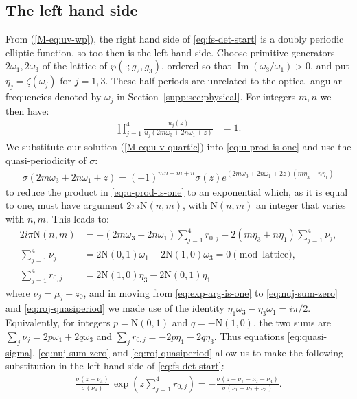 \documentclass[11pt,a4paper]{article}
\newcommand{\externaleqref}[1]{\textup{(\ref*{#1})}}
\begin{document}
\subsection{The left hand side}\label{supp:subsec:fs-quasiperiod}
From \externaleqref{M-eq:uv-wp}, the right hand side of \eqref{eq:fs-det-start} is a doubly periodic elliptic function,
so too then is the left hand side.
Choose primitive generators $2\omega_1,2\omega_3$ of the lattice of $\wp(\cdot;g_2,g_3)$, ordered so that $\operatorname{Im}(\omega_3/\omega_1)>0$, and put $\eta_j=\zeta(\omega_j)$ for $j=1,3$.
These half-periods are unrelated to the optical angular frequencies denoted by $\omega_j$ in Section~\ref{supp:sec:physical}.
For integers $m,n$ we then have:
\begin{align}
\prod_{j=1}^{4} \frac{u_j{\left(z\right)}}{u_j{\left(2 m {\omega}_{3} + 2 n {\omega}_{1} + z\right)}} & = 1. \label{eq:u-prod-is-one}
\end{align}
We substitute our solution \externaleqref{M-eq:u-v-quartic} into \eqref{eq:u-prod-is-one} and use the quasi-periodicity of $\sigma$:
\begin{align}
\sigma{\left(2 m {\omega}_{3} + 2 n {\omega}_{1} + z\right)} = \left(-1\right)^{m n + m + n} \sigma{\left(z\right)} e^{\left(2 m {\omega}_{3} + 2 n {\omega}_{1} + 2 z\right) \left(m\eta_3+n\eta_1\right)} \label{eq:quasi-sigma}
\end{align}
to reduce the product in \eqref{eq:u-prod-is-one} to an exponential which, as it is equal to one, must have argument $2\pi i \mathrm{N}(n,m)$, with $\mathrm{N}(n,m)$ an integer that varies with $n,m$.
This leads to:
\begin{align}
2 i \pi \mathrm{N}{\left(n,m \right)} &= - \left(2 m {\omega}_{3} + 2 n {\omega}_{1}\right) \sum_{j=1}^{4} {r}_{0,j} - 2 \left(m\eta_3+n\eta_1\right) \sum_{j=1}^{4} {\nu}_{j}, \label{eq:exp-arg-is-one} \\
\sum_{j=1}^{4} {\nu}_{j} &= 2 \mathrm{N}{\left(0,1 \right)} {\omega}_{1} - 2 \mathrm{N}{\left(1,0 \right)} {\omega}_{3} = 0 \pmod{\text{lattice}}, \label{eq:nuj-sum-zero}  \\
\sum_{j=1}^{4} {r}_{0,j} &= 2\mathrm{N}(1,0)\eta_3-2\mathrm{N}(0,1)\eta_1 \label{eq:roj-quasiperiod}
\end{align}
where $\nu_j=\mu_j-z_0$, and in moving from \eqref{eq:exp-arg-is-one} to \eqref{eq:nuj-sum-zero} and \eqref{eq:roj-quasiperiod} we made use of the identity $\eta_1\omega_3-\eta_3\omega_1=i\pi/2$.
Equivalently, for integers $p=\mathrm{N}(0,1)$ and $q=-\mathrm{N}(1,0)$, the two sums are $\sum_j\nu_j=2p\omega_1+2q\omega_3$ and $\sum_jr_{0,j}=-2p\eta_1-2q\eta_3$. Thus equations \eqref{eq:quasi-sigma}, \eqref{eq:nuj-sum-zero} and \eqref{eq:roj-quasiperiod} allow us to make the following substitution in the left hand side of \eqref{eq:fs-det-start}:
\begin{align}
\frac{\sigma{\left(z + {\nu}_{4} \right)}}{\sigma{\left({\nu}_{4} \right)}}\,\exp{\left(z \sum\limits_{j=1}^{4} {r}_{0,j}\right)} = - \frac{\sigma{\left(z - {\nu}_{1} - {\nu}_{2} - {\nu}_{3} \right)}}{\sigma{\left({\nu}_{1} + {\nu}_{2} + {\nu}_{3} \right)}}.
\end{align}
\end{document}
